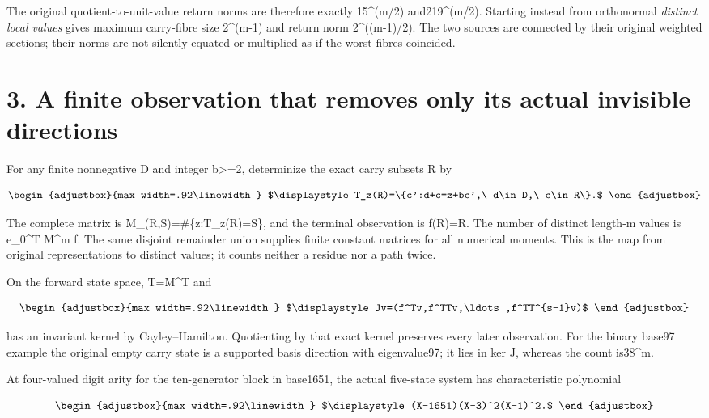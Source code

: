 The original quotient-to-unit-value return norms are therefore exactly 15\^{}(m/2) and219\^{}(m/2). Starting instead from orthonormal \emph{distinct local values} gives maximum carry-fibre size 2\^{}(m-1) and return norm 2\^{}((m-1)/2). The two sources are connected by their original weighted sections; their norms are not silently equated or multiplied as if the worst fibres coincided.

\section{3. A finite observation that removes only its actual invisible directions}\label{n21-a-finite-observation-that-removes-only-its-actual-invisible-directions}

For any finite nonnegative D and integer b\textgreater=2, determinize the exact carry subsets R by

\[
\begin{adjustbox}{max width=.92\linewidth}
$\displaystyle T_z(R)=\{c':d+c=z+bc',\ d\in D,\ c\in R\}.$
\end{adjustbox}
\]

The complete matrix is M\_(R,S)=\#\{z:T\_z(R)=S\}, and the terminal observation is f(R)=\textbar R\textbar. The number of distinct length-m values is e\_0\^{}T M\^{}m f. The same disjoint remainder union supplies finite constant matrices for all numerical moments. This is the map from original representations to distinct values; it counts neither a residue nor a path twice.

On the forward state space, T=M\^{}T and

\[
\begin{adjustbox}{max width=.92\linewidth}
$\displaystyle Jv=(f^Tv,f^TTv,\ldots,f^TT^{s-1}v)$
\end{adjustbox}
\]

has an invariant kernel by Cayley--Hamilton. Quotienting by that exact kernel preserves every later observation. For the binary base97 example the original empty carry state is a supported basis direction with eigenvalue97; it lies in ker J, whereas the count is38\^{}m.

At four-valued digit arity for the ten-generator block in base1651, the actual five-state system has characteristic polynomial

\[
\begin{adjustbox}{max width=.92\linewidth}
$\displaystyle (X-1651)(X-3)^2(X-1)^2.$
\end{adjustbox}
\]

